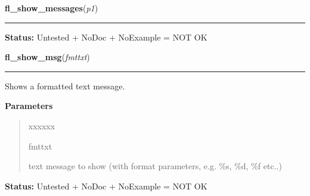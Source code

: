     \label{xformslib:library:fl_show_messages}

    \vspace{0.5ex}

\hspace{.8\funcindent}\begin{boxedminipage}{\funcwidth}

    \raggedright \textbf{fl\_show\_messages}(\textit{p1})

    \vspace{-1.5ex}

    \rule{\textwidth}{0.5\fboxrule}
\setlength{\parskip}{2ex}
\setlength{\parskip}{1ex}
\textbf{Status:} Untested + NoDoc + NoExample = NOT OK



    \end{boxedminipage}

    \label{xformslib:library:fl_show_msg}

    \vspace{0.5ex}

\hspace{.8\funcindent}\begin{boxedminipage}{\funcwidth}

    \raggedright \textbf{fl\_show\_msg}(\textit{fmttxt})

    \vspace{-1.5ex}

    \rule{\textwidth}{0.5\fboxrule}
\setlength{\parskip}{2ex}
    Shows a formatted text message.

\setlength{\parskip}{1ex}
      \textbf{Parameters}
      \vspace{-1ex}

      \begin{quote}
        \begin{Ventry}{xxxxxx}

          \item[fmttxt]

          text message to show (with format parameters, e.g. \%s, \%d, \%f 
          etc..)

        \end{Ventry}

      \end{quote}

\textbf{Status:} Untested + NoDoc + NoExample = NOT OK



    \end{boxedminipage}

